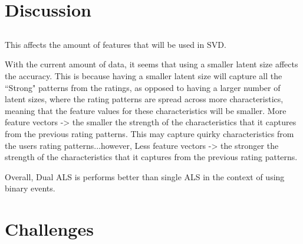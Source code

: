 \section{Discussion}

\subsection{}
This affects the amount of features that will be used in SVD.

With the current amount of data, it seems that using a smaller latent size affects the accuracy. This is because having a smaller latent size will capture all the ``Strong" patterns from the ratings, as opposed to having a larger number of latent sizes, where the rating patterns are spread across more characteristics, meaning that the feature values for these characteristics will be smaller. More feature vectors -> the smaller the strength of the characteristics that it captures from the previous rating patterns. This may capture quirky characteristics from the users rating patterns...however, Less feature vectors -> the stronger the strength of the characteristics that it captures from the previous rating patterns. 

Overall, Dual ALS is performs better than single ALS in the context of using binary events.

\section{Challenges}




